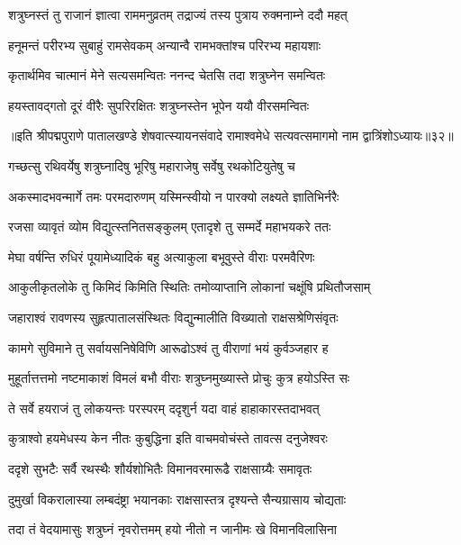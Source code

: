 \twolineshloka
{शत्रुघ्नस्तं तु राजानं ज्ञात्वा राममनुव्रतम्}
{तद्राज्यं तस्य पुत्राय रुक्मनाम्ने ददौ महत्}%

\twolineshloka
{हनूमन्तं परीरभ्य सुबाहुं रामसेवकम्}
{अन्यान्वै रामभक्तांश्च परिरभ्य महायशाः}%

\twolineshloka
{कृतार्थमिव चात्मानं मेने सत्यसमन्वितः}
{ननन्द चेतसि तदा शत्रुघ्नेन समन्वितः}%

\twolineshloka
{हयस्तावद्गतो दूरं वीरैः सुपरिरक्षितः}
{शत्रुघ्नस्तेन भूपेन ययौ वीरसमन्वितः}%

॥इति श्रीपद्मपुराणे पातालखण्डे शेषवात्स्यायनसंवादे रामाश्वमेधे सत्यवत्समागमो नाम द्वात्रिंशोऽध्यायः॥३२॥



\twolineshloka
{गच्छत्सु रथिवर्येषु शत्रुघ्नादिषु भूरिषु}
{महाराजेषु सर्वेषु रथकोटियुतेषु च}%

\twolineshloka
{अकस्मादभवन्मार्गे तमः परमदारुणम्}
{यस्मिन्स्वीयो न पारक्यो लक्ष्यते ज्ञातिभिर्नरैः}%

\twolineshloka
{रजसा व्यावृतं व्योम विद्युत्स्तनितसङ्कुलम्}
{एतादृशे तु सम्मर्दे महाभयकरे ततः}%

\twolineshloka
{मेघा वर्षन्ति रुधिरं पूयामेध्यादिकं बहु}
{अत्याकुला बभूवुस्ते वीराः परमवैरिणः}%

\twolineshloka
{आकुलीकृतलोके तु किमिदं किमिति स्थितिः}
{तमोव्याप्तानि लोकानां चक्षूंषि प्रथितौजसाम्}%

\twolineshloka
{जहाराश्वं रावणस्य सुहृत्पातालसंस्थितः}
{विद्युन्मालीति विख्यातो राक्षसश्रेणिसंवृतः}%

\twolineshloka
{कामगे सुविमाने तु सर्वायसनिषेविणि}
{आरूढोऽश्वं तु वीराणां भयं कुर्वञ्जहार ह}%

\twolineshloka
{मुहूर्तात्तत्तमो नष्टमाकाशं विमलं बभौ}
{वीराः शत्रुघ्नमुख्यास्ते प्रोचुः कुत्र हयोऽस्ति सः}%

\twolineshloka
{ते सर्वे हयराजं तु लोकयन्तः परस्परम्}
{ददृशुर्न यदा वाहं हाहाकारस्तदाभवत्}%

\twolineshloka
{कुत्राश्वो हयमेधस्य केन नीतः कुबुद्धिना}
{इति वाचमवोचंस्ते तावत्स दनुजेश्वरः}%

\twolineshloka
{ददृशे सुभटैः सर्वै रथस्थैः शौर्यशोभितैः}
{विमानवरमारूढै राक्षसाग्र्यैः समावृतः}%

\twolineshloka
{दुमुर्खा विकरालास्या लम्बदंष्ट्रा भयानकाः}
{राक्षसास्तत्र दृश्यन्ते सैन्यग्रासाय चोद्यताः}%

\twolineshloka
{तदा तं वेदयामासुः शत्रुघ्नं नृवरोत्तमम्}
{हयो नीतो न जानीमः खे विमानविलासिना}%

